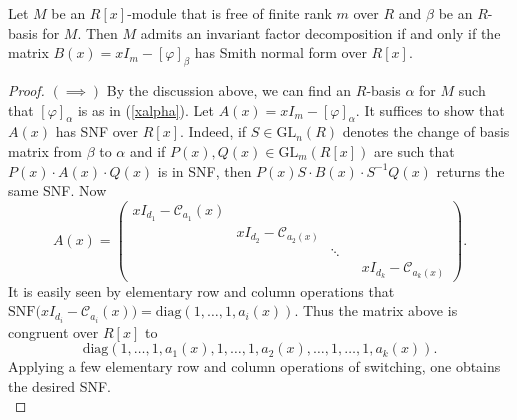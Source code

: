 \documentclass[ALCO, Unicode]{cedram}
\newcommand{\diag}{\mathrm{diag}}
\newcommand{\GL}{\mathrm{GL}}
\begin{document}
\begin{theorem} \label{RCFEquivSNF} Let $ M $ be an $ R[x] $-module that is free of finite rank $ m $ over $ R$ and  $ \beta $ be an $ R$-basis for $ M $.  Then $M $ admits an invariant factor decomposition if and only if the matrix   $   B(x) =  x I_{m}  -   [    \varphi ] _{     \beta }     $ has Smith normal form over $ R[x] $. 
\end{theorem} 

\begin{proof} $( \! \implies \! ) $ By the discussion above, we can find an $ R$-basis $ \alpha $ for $ M $ such that   $[\varphi]_{\alpha} $ is as in (\ref{xalpha}).  Let $ A(x) = xI_{m} - [\varphi]_{\alpha} $. It suffices to show that $ A(x) $ has SNF over $ R[x] $.  Indeed, if $ S \in \GL_{n}(R)  $ denotes the change of  basis   matrix from $ \beta $ to $ \alpha $  and if $ P(x), Q(x) \in \GL_{m}(R[x]) $ are such  that  $ P(x)   \cdot A(x)  \cdot Q(x) $ is in SNF,  then $ P(x) S  \cdot B(x) \cdot S^{-1} Q(x) $ returns  the same SNF.  Now  
 $$  A(x)  = \begin{pmatrix}   xI_{d_{1}}  -  \mathcal{C}_{a_{1}}(x)  &   &    &    \\[0.2em]
  &   x I_{ d_{2}}  -    \mathcal{C}_{a_{2}(x)} &    &      &       \\[0.2em]
&    &    \ddots    &  &      \\[0.2em]
&                       &                                      &  &       xI_{d_{k}}  -   \mathcal{C}_{a_{k}(x)}      
\end{pmatrix}    . $$   
It is easily seen by elementary row and  column operations that $ \mathrm{SNF}\big (xI_{d_{i}} -  \mathcal{C}_{a_{i}}(x)\big ) = \mathrm{diag} (1,\ldots,1,a_{i}(x)) $. Thus the matrix above is congruent over $ R[x] $ to $$ \diag( 1,  \ldots,   1   ,  a_{1}(x) , 1 , \ldots, 1 ,  a_{2}(x) , \ldots, 1, \ldots,  1 ,   a_ { k }     ( x  )   ) . $$   
Applying a few elementary row and column operations of switching, one obtains the desired SNF. \\         



\end{proof}
\end{document}
